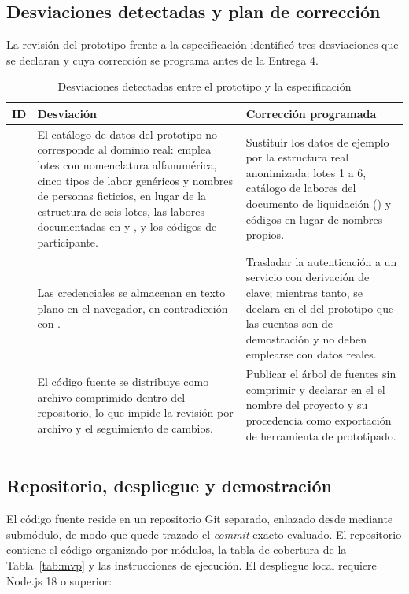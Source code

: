 \subsection{Desviaciones detectadas y plan de corrección}

La revisión del prototipo frente a la especificación identificó tres desviaciones que se declaran y
cuya corrección se programa antes de la Entrega 4.

\begin{longtable}{|C{1.4cm}|L{6.6cm}|L{7.0cm}|}
\hline
{}\textbf{ID} & \textbf{Desviación} & \textbf{Corrección programada} \\
\hline
\endhead
{} & El catálogo de datos del prototipo no corresponde al dominio real: emplea lotes con nomenclatura alfanumérica, cinco tipos de labor genéricos y nombres de personas ficticios, en lugar de la estructura de seis lotes, las labores documentadas en  y , y los códigos de participante. & Sustituir los datos de ejemplo por la estructura real anonimizada: lotes 1 a 6, catálogo de labores del documento de liquidación () y códigos  en lugar de nombres propios. \\ \hline
{} & Las credenciales se almacenan en texto plano en el navegador, en contradicción con . & Trasladar la autenticación a un servicio con derivación de clave; mientras tanto, se declara en el  del prototipo que las cuentas son de demostración y no deben emplearse con datos reales. \\ \hline
{} & El código fuente se distribuye como archivo comprimido dentro del repositorio, lo que impide la revisión por archivo y el seguimiento de cambios. & Publicar el árbol de fuentes sin comprimir y declarar en el  el nombre del proyecto y su procedencia como exportación de herramienta de prototipado. \\ \hline
\caption{Desviaciones detectadas entre el prototipo y la especificación}
\end{longtable}

\subsection{Repositorio, despliegue y demostración}

El código fuente reside en un repositorio Git separado, enlazado desde 
mediante submódulo, de modo que quede trazado el \emph{commit} exacto evaluado. El repositorio
contiene el código organizado por módulos, la tabla de cobertura de la Tabla~\ref{tab:mvp} y las
instrucciones de ejecución. El despliegue local requiere Node.js 18 o superior:

